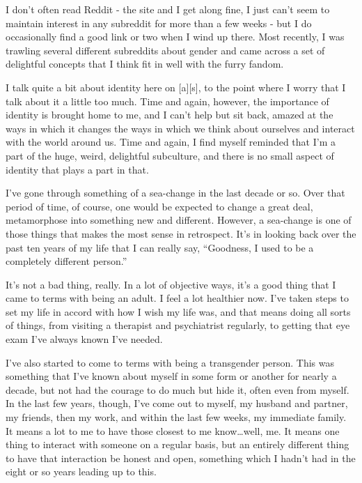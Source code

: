 
I don't often read Reddit - the site and I get along fine, I just can't seem to maintain interest in any subreddit for more than a few weeks - but I do occasionally find a good link or two when I wind up there. Most recently, I was trawling several different subreddits about gender and came across a set of delightful concepts that I think fit in well with the furry fandom.

I talk quite a bit about identity here on {[}a{]}{[}s{]}, to the point where I worry that I talk about it a little too much. Time and again, however, the importance of identity is brought home to me, and I can't help but sit back, amazed at the ways in which it changes the ways in which we think about ourselves and interact with the world around us. Time and again, I find myself reminded that I'm a part of the huge, weird, delightful subculture, and there is no small aspect of identity that plays a part in that.

I've gone through something of a sea-change in the last decade or so. Over that period of time, of course, one would be expected to change a great deal, metamorphose into something new and different. However, a sea-change is one of those things that makes the most sense in retrospect. It's in looking back over the past ten years of my life that I can really say, ``Goodness, I used to be a completely different person.''

It's not a bad thing, really. In a lot of objective ways, it's a good thing that I came to terms with being an adult. I feel a lot healthier now. I've taken steps to set my life in accord with how I wish my life was, and that means doing all sorts of things, from visiting a therapist and psychiatrist regularly, to getting that eye exam I've always known I've needed.

I've also started to come to terms with being a transgender person. This was something that I've known about myself in some form or another for nearly a decade, but not had the courage to do much but hide it, often even from myself. In the last few years, though, I've come out to myself, my husband and partner, my friends, then my work, and within the last few weeks, my immediate family. It means a lot to me to have those closest to me know\ldots{}well, me. It means one thing to interact with someone on a regular basis, but an entirely different thing to have that interaction be honest and open, something which I hadn't had in the eight or so years leading up to this.

